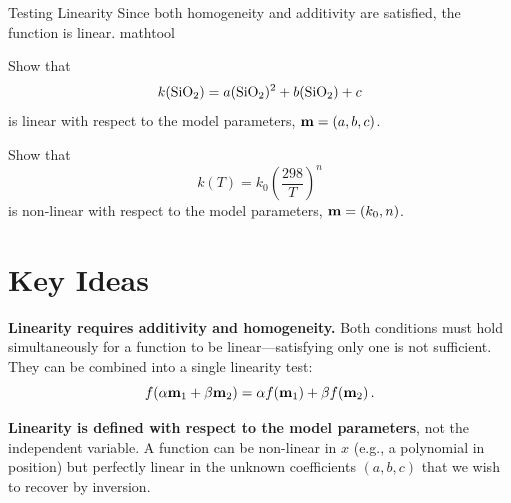 \begin{activity}{Testing Linearity}
{Since both homogeneity and additivity are satisfied, the function is linear.
}{mathtool}

\begin{questions}
    Show that
    \[
        k(\ce{SiO2}) = a (\ce{SiO2})^2 + b (\ce{SiO2}) + c
    \]
    is linear with respect to the model parameters, $\vb{m} = (a,b,c)$.
    \answerbox[30em]

    Show that 
    \[
        k(T) = k_0 \left( \frac{298}{T} \right)^n
    \]
    is non-linear with respect to the model parameters, $\vb{m} = (k_0,n)$.
    \answerbox[30em]

    \answerbox

\end{questions}

\section*{Key Ideas}

\textbf{Linearity requires additivity and homogeneity.}  Both conditions must hold simultaneously for a function to be linear---satisfying only one is not sufficient. They can be combined into a single linearity test:
\[
    f(\alpha \vb{m}_1 + \beta \vb{m}_2) = \alpha f(\vb{m}_1) + \beta f(\vb{m}_2) \, .
\]

\textbf{Linearity is defined with respect to the model parameters}, not the independent variable. A function can be non-linear in $x$ (e.g., a polynomial in position) but perfectly linear in the unknown coefficients $(a, b, c)$ that we wish to recover by inversion.

\end{activity}
